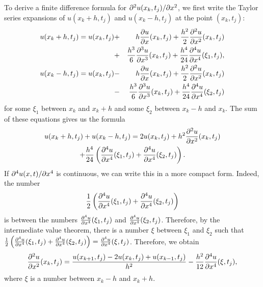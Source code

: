 To derive a finite difference formula for ${\partial}^2 u(x_k,t_j)/{\partial} x^2$, we first write the Taylor series expansions
of $u(x_k+h,t_j)$ and $u(x_k-h,t_j)$ at the point $(x_k,t_j)$:
\begin{eqnarray*}
u(x_k+h,t_j)=u(x_k,t_j)&+&h \frac{{\partial} u}{{\partial} x}(x_k,t_j)+
\frac{h^2}{2}\frac{{\partial}^2 u}{{\partial} x^2}(x_k,t_j)\\
&+&\frac{h^3}{6}\frac{{\partial}^3 u}{{\partial} x^3}(x_k,t_{j})+
\frac{h^4}{24}\frac{{\partial}^4 u}{{\partial} x^4}(\xi_1,t_{j}), \\
u(x_k-h,t_j)=u(x_k,t_j)&-&h \frac{{\partial} u}{{\partial} x}(x_k,t_j)+
\frac{h^2}{2}\frac{{\partial}^2 u}{{\partial} x^2}(x_k,t_j)\\
&-&\frac{h^3}{6}\frac{{\partial}^3 u}{{\partial} x^3}(x_k,t_{j})+
\frac{h^4}{24}\frac{{\partial}^4 u}{{\partial} x^4}(\xi_2,t_{j}) 
\end{eqnarray*}
for some $\xi_{1}$ between $x_{k}$ and $x_{k}+h$
and some $\xi_{2}$ between $x_{k}-h$ and $x_{k}$. 
The sum of these equations gives us the formula
\begin{multline}
u(x_k+h,t_j)+u(x_k-h,t_j)=2u(x_k,t_j)+ h^2\frac{{\partial}^2 u}{{\partial}
x^2}(x_k,t_j)\\
+ \frac{h^4}{24}\left(\frac{{\partial}^4 u}{{\partial}
x^4}(\xi_1,t_{j}) +\frac{{\partial}^4 u}{{\partial} x^4}(\xi_2,t_{j})\right).
\end{multline}
If ${\partial}^4 u(x,t)/{\partial} x^4$ is continuous, we can write this in a more compact form. Indeed, the number
\[
\frac{1}{2}\left(\frac{{\partial}^4 u}{{\partial} x^4}(\xi_{1}, t_{j})+\frac{{\partial}^4 u}{{\partial} x^4}(\xi_{2},t_{j})\right)
\]
is between
the numbers $\frac{{\partial}^4 u}{{\partial} x^4}(\xi_{1},t_{j})$ and $\frac{{\partial}^4 u}{{\partial} x^4}(\xi_{2},t_{j})$. Therefore,
by the intermediate value theorem, there is a number $\xi$ between $\xi_{1}$ and $\xi_{2}$ such that
$\frac{1}{2}\left(\frac{{\partial}^4 u}{{\partial} x^4}(\xi_{1},t_{j})+\frac{{\partial}^4 u}{{\partial} x^4}(\xi_{2},t_{j})\right)
=\frac{{\partial}^4 u}{{\partial} x^4}(\xi,t_{j})$. Therefore, we obtain
\begin{equation}
\frac{{\partial}^2 u}{{\partial} x^2}(x_k,t_j)=\frac{u(x_{k+1},t_j)-2u(x_k,t_j)+u(x_{k-1},t_j)}{h^2}
-\frac{h^2}{12}\frac{{\partial}^4 u}{{\partial} x^4}(\xi,t_{j}), \label{a17}
\end{equation}
where $\xi$ is a number between $x_{k}-h$ and $x_{k}+h$.

  
 
